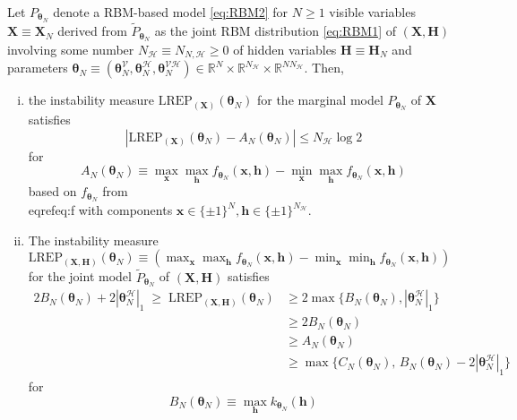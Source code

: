 \documentclass[12pt]{article}
\theoremstyle{definition}
\newcommand{\REP}{\mathrm{LREP}}
\newcommand{\elt}{A_{N}(\boldsymbol \theta_N) }
\newcommand{\Gam}{B_{N}(\boldsymbol \theta_N) }
\newcommand{\Gamc}{C_{N}(\boldsymbol \theta_N) }
\begin{document}
\protect\hypertarget{prp:prop2}{}{\label{prp:prop2}}Let
\(P_{\boldsymbol \theta_N}\) denote a RBM-based model \eqref{eq:RBM2} for
\(N\geq 1\) visible variables \(\boldsymbol X \equiv \boldsymbol X_N\)
derived from \(\tilde{P}_{\boldsymbol \theta_N}\) as the joint RBM
distribution \eqref{eq:RBM1} of \((\boldsymbol X, \boldsymbol H)\)
involving some number \(N_{\mathcal{H}} \equiv N_{N,\mathcal{H}}\geq 0\)
of hidden variables \(\boldsymbol H \equiv \boldsymbol H_N\) and
parameters
\(\boldsymbol \theta_N \equiv (\boldsymbol \theta_N^{\mathcal{V}},\boldsymbol \theta_N^{\mathcal{H}}, \boldsymbol \theta_N^{\mathcal{VH}}) \in\mathbb{R}^{N}\times \mathbb{R}^{N_{\mathcal{H}}} \times \mathbb{R}^{N N_{\mathcal{H}}}\).
Then,
\begin{enumerate}[(i)]
\item the instability measure $\REP_{(\boldsymbol X)}(\boldsymbol \theta_N)$ for the marginal model $P_{\boldsymbol \theta_N}$ of  $\boldsymbol X$ satisfies
    $$
    \left| \REP_{(\boldsymbol X)}(\boldsymbol \theta_N)  - \elt\right| \leq    N_{\mathcal{H}}  \log 2
    $$
    for
    $$
    \elt  \equiv   \max_{ \boldsymbol x} \max_{ \boldsymbol h  } f_{\boldsymbol \theta_N} (\boldsymbol x, \boldsymbol h)-\min_{ \boldsymbol x } \max_{ \boldsymbol h }f_{\boldsymbol \theta_N} (\boldsymbol x, \boldsymbol h)
    $$
    based on $f_{\boldsymbol \theta_N}$ from \\eqref{eq:f} with components $\boldsymbol x \in \{\pm 1\}^{N}, \boldsymbol h \in \{\pm 1\}^{N_{\mathcal{H}}}$.
\item The instability measure $\REP_{(\boldsymbol X, \boldsymbol H)}(\boldsymbol \theta_N)\equiv \left(\max_{ \boldsymbol x} \max_{ \boldsymbol h  } f_{\boldsymbol \theta_N} (\boldsymbol x, \boldsymbol h)-\min_{ \boldsymbol x } \min_{ \boldsymbol h }f_{\boldsymbol \theta_N} (\boldsymbol x, \boldsymbol h)\right)$ for the joint model $\tilde{P}_{\boldsymbol \theta_N}$ of $(\boldsymbol X, \boldsymbol H)$ satisfies
    \begin{align*}
    2\Gam +  2|\boldsymbol \theta_N^{\mathcal{H}} |_{1} \; \geq \; \REP_{(\boldsymbol X, \boldsymbol H)}(\boldsymbol \theta_N)    & \geq 
    2\max\big\{\Gam,   |\boldsymbol \theta_N^{\mathcal{H}} |_{1}\big\} \\
    &\geq  2\Gam\\
    &\geq  \elt\\
    &\geq   \max\big\{  \Gamc, \, \Gam  - 2|\boldsymbol \theta_N^{\mathcal{H}} |_{1}  \big\}
    \end{align*}
    for
    $$
    \Gam \equiv \max_{ \boldsymbol h} k_{\boldsymbol \theta_N} (\boldsymbol h)
$$
\end{enumerate}
\end{document}
